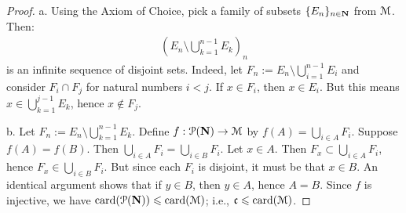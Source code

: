 \documentclass[10pt,twoside,openany]{memoir}
\begin{document}
    {\color{blue} \begin{proof}
        a. Using the Axiom of Choice, pick a family of subsets $\{E_n\}_{n \in \mathbf{N}}$ from $\mathcal{M}$. Then:
            \begin{equation*}
            \begin{split}
                \left( E_n \setminus \bigcup_{k = 1}^{n-1}E_k \right)_n
            \end{split}
            \end{equation*}
        is an infinite sequence of disjoint sets. Indeed, let $F_n := E_n \setminus \bigcup_{i = 1}^{n-1}E_i$ and consider $F_i \cap F_j$ for natural numbers $i < j$. If $x \in F_i$, then $x \in E_i$. But this means $x \in \bigcup_{k = 1}^{j - 1}E_k$, hence $x \not\in F_j$.

        b. Let $F_n := E_n \setminus \bigcup_{k = 1}^{n-1}E_k$. Define $f:\mathcal{P}(\mathbf{N}) \rightarrow \mathcal{M}$ by $f(A) = \bigcup_{i \in A}F_i$. Suppose $f(A) = f(B)$. Then $\bigcup_{i \in A}F_i = \bigcup_{i \in B}F_i$. Let $x \in A$. Then $F_x \subset \bigcup_{i \in A}F_i$, hence $F_x \in \bigcup_{i \in B}F_i$. But since each $F_i$ is disjoint, it must be that $x \in B$. An identical argument shows that if $y \in B$, then $y \in A$, hence $A = B$. Since $f$ is injective, we have $\operatorname{card}(\mathcal{P}(\mathbf{N})) \leqslant \operatorname{card}(\mathcal{M})$; i.e., $\mathfrak{c} \leqslant \operatorname{card}(\mathcal{M})$.
    \end{proof}}
\end{document}
